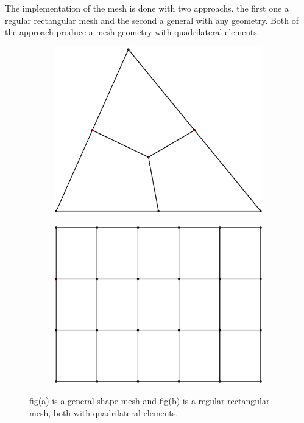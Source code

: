 \documentclass[11pt, a4paper]{article}
\numberwithin{equation}{section}
\begin{document}
The implementation of the mesh is done with two approachs, the first one a regular rectangular mesh and the second a general with any geometry. Both of the approach produce a mesh geometry with quadrilateral elements.


\begin{figure}[H]
\centering
	\begin{subfigure}[H]{0.49\textwidth}
		\includegraphics[width=1.2\textwidth]{fig/mesh1.eps}
		\caption{}
		\label{fig:1}
	\end{subfigure}
	\begin{subfigure}[H]{0.49\textwidth}
		\includegraphics[width=\textwidth]{fig/mesh2.eps}
		\caption{}
		\label{fig:2}
	\end{subfigure}
	\caption{fig(a) is a general shape mesh and fig(b) is a regular rectangular mesh, both with quadrilateral elements.}
	\label{fig:3_1}
\end{figure}
\end{document}
